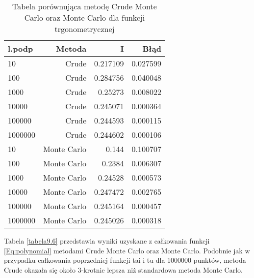 \documentclass[12pt,twoside]{article}
\begin{document}
\begin{table}[H]
\centering 
\caption{Tabela porównująca metodę Crude Monte Carlo oraz Monte Carlo dla funkcji trgonometrycznej}
\label{tabela9.6}
\begin{tabular}{lrrr}
\toprule
{l.podp} & Metoda &  I &  Błąd \\
\midrule
10  &     Crude & 0.217109  &   0.027599 \\
100  &     Crude & 0.284756 &   0.040048 \\
1000  &    Crude & 0.25273   &   0.008022  \\
10000  &    Crude & 0.245071  &   0.000364  \\
100000  &    Crude & 0.244593 &    0.000115   \\
1000000  &    Crude & 0.244602 &    0.000106   \\
\midrule
10  &     Monte Carlo & 0.144  &   0.100707 \\
100  &     Monte Carlo & 0.2384  &   0.006307 \\
1000  &    Monte Carlo & 0.24528   &   0.000573  \\
10000  &    Monte Carlo & 0.247472  &   0.002765  \\
100000  &    Monte Carlo & 0.245164 &    0.000457   \\
1000000  &    Monte Carlo & 0.245026 &    0.000318   \\
\bottomrule
\end{tabular}
\end{table}


Tabela \eqref{tabela9.6} przedstawia wyniki uzyskane z całkowania funkcji \eqref{Eq:polynomial} metodami Crude Monte Carlo oraz Monte Carlo. Podobnie jak w przypadku całkowania poprzedniej funkcji tai i tu dla 1000000 punktów, metoda Crude okazała się  około 3-krotnie lepsza niż standardowa metoda Monte Carlo. 
\end{document}
